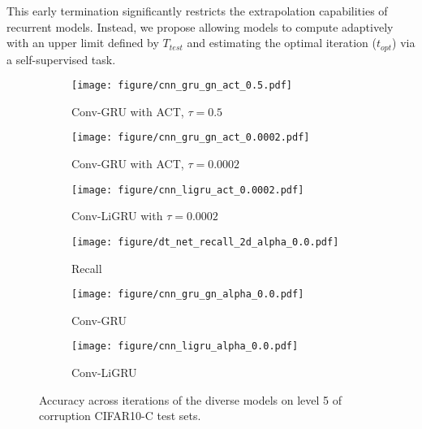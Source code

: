 This early termination significantly restricts the extrapolation capabilities of recurrent models. 
Instead, we propose allowing models to compute adaptively with an upper limit defined by $T_{test}$ and estimating the optimal iteration ($t_{opt}$) via a self-supervised task. 

\begin{figure*}[htbp]
    \centering
    \begin{subfigure}{0.32\textwidth}
        \texttt{[image: figure/cnn\_gru\_gn\_act\_0.5.pdf]}
        \caption{Conv-GRU with ACT, $\tau = 0.5$ }
        \label{fig:cnn_gru_gn_act_0.5}
    \end{subfigure}
    \hfill
    \begin{subfigure}{0.32\textwidth}
        \texttt{[image: figure/cnn\_gru\_gn\_act\_0.0002.pdf]}
        \caption{Conv-GRU with ACT, $\tau = 0.0002$ }
        \label{fig:cnn_gru_gn_act_0.0002}
    \end{subfigure}
    \hfill
    \begin{subfigure}{0.32\textwidth}
        \texttt{[image: figure/cnn\_ligru\_act\_0.0002.pdf]}
        \caption{Conv-LiGRU with $\tau = 0.0002$}
        \label{fig:cnn_ligru_act_0.0002}
    \end{subfigure}
    \vfill
    \begin{subfigure}{0.32\textwidth}
        \texttt{[image: figure/dt\_net\_recall\_2d\_alpha\_0.0.pdf]}
        \caption{Recall}
        \label{fig:dt_net_recall_2d_alpha_0.0}
    \end{subfigure}
    \hfill
    \begin{subfigure}{0.32\textwidth}
        \texttt{[image: figure/cnn\_gru\_gn\_alpha\_0.0.pdf]}
        \caption{Conv-GRU}
        \label{fig:cnn_gru_gn_alpha_0.0}
    \end{subfigure}
    \hfill
    \begin{subfigure}{0.32\textwidth}
        \texttt{[image: figure/cnn\_ligru\_alpha\_0.0.pdf]}
        \caption{Conv-LiGRU}
        \label{fig:cnn_ligru_alpha_0.0}
    \end{subfigure}
    
    \caption{Accuracy across iterations of the diverse models on level 5 of corruption CIFAR10-C test sets.}
    \label{fig:arch_and_hyper}
\end{figure*}


